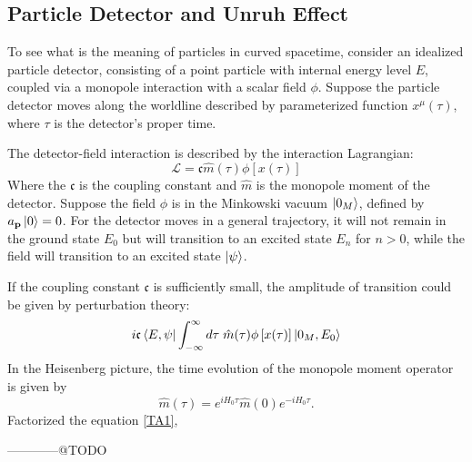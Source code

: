 \documentclass[12pt]{article}
\numberwithin{equation}{subsection}
\theoremstyle{mystyle}{\newtheorem{definition}{Definition}[subsection]}
\theoremstyle{mystyle}{\newtheorem{theorem}[definition]{Theorem}}
\theoremstyle{mystyle}{\newtheorem*{remark}{Remark}}
\theoremstyle{mystyle}{\newtheorem{example}{Example}[subsection]}
\theoremstyle{mystyle}{\newtheorem{examples}{Examples}[subsection]}
\theoremstyle{mystyle}{\newtheorem{cthm}{}[subsection]}
\begin{document}
\subsection{Particle Detector and Unruh Effect}
To see what is the meaning of particles in curved spacetime, consider an idealized particle detector,
consisting of a point particle with internal energy level \(E\),
coupled via a monopole interaction with a scalar field \(\phi\).
Suppose the particle detector moves along the worldline described by parameterized function \(x^\mu(\tau)\),
where \(\tau\) is the detector's proper time.
\par The detector-field interaction is described by the interaction Lagrangian:
\begin{equation}
  \mathcal{L}=\mathfrak{c} \hat{m}(\tau)\phi\left[x(\tau)\right]
\end{equation}
Where the \(\mathfrak{c}\) is the coupling constant and \(\hat{m}\) is the monopole moment of the detector.
Suppose the field \(\phi\) is in the Minkowski vacuum \(\ket{0_{M}}\), defined by \(a_{\mathbf{p}}\ket{0}=0\).
For the detector moves in a general trajectory,
it will not remain in the ground state \(E_0\) but will transition to an excited state \(E_n\) for \(n>0\),
while the field will transition to an excited state \(\ket{\psi}\). \par
If the coupling constant \(\mathfrak{c}\) is sufficiently small, the amplitude of transition could be given by perturbation theory:
\begin{equation}\label{TA1}
  i\mathfrak{c} \bra{E,\psi}\int_{-\infty}^{\infty}d\tau\;\hat{m}(\tau)\phi\left[x(\tau)\right]\ket{0_{M},E_{0}}
\end{equation}
In the Heisenberg picture, the time evolution of the monopole moment operator is given by
\[\hat{m}(\tau)= e^{iH_0\tau}\hat{m}(0)e^{-iH_0\tau}.\]
Factorized the equation \ref{TA1},



------------@TODO
\end{document}
